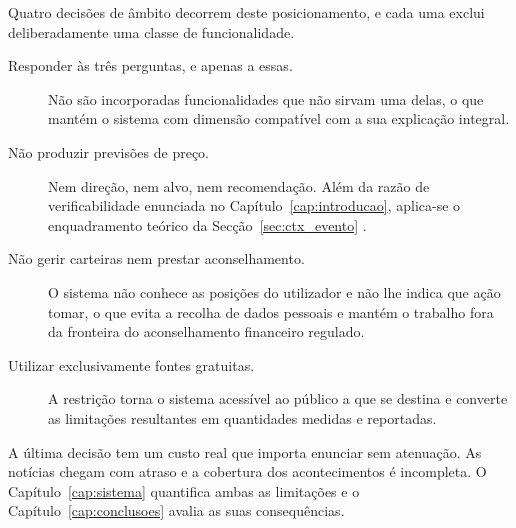 Quatro decisões de âmbito decorrem deste posicionamento, e cada uma exclui deliberadamente uma
classe de funcionalidade.

\begin{description}
  \item[Responder às três perguntas, e apenas a essas.] Não são incorporadas funcionalidades que
        não sirvam uma delas, o que mantém o sistema com dimensão compatível com a sua explicação
        integral.
  \item[Não produzir previsões de preço.] Nem direção, nem alvo, nem recomendação. Além da razão de
        verificabilidade enunciada no Capítulo~\ref{cap:introducao}, aplica-se o enquadramento
        teórico da Secção~\ref{sec:ctx_evento} \autocite{fama1970efficient}.
  \item[Não gerir carteiras nem prestar aconselhamento.] O sistema não conhece as posições do
        utilizador e não lhe indica que ação tomar, o que evita a recolha de dados pessoais e
        mantém o trabalho fora da fronteira do aconselhamento financeiro regulado.
  \item[Utilizar exclusivamente fontes gratuitas.] A restrição torna o sistema acessível ao público
        a que se destina e converte as limitações resultantes em quantidades medidas e reportadas.
\end{description}

A última decisão tem um custo real que importa enunciar sem atenuação. As notícias chegam com
atraso e a cobertura dos acontecimentos é incompleta. O Capítulo~\ref{cap:sistema} quantifica
ambas as limitações e o Capítulo~\ref{cap:conclusoes} avalia as suas consequências.
